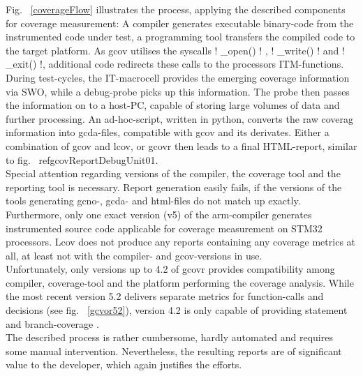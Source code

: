 \documentclass[master,english,smartquotes,apa]{hgbthesis}
\begin{document}
			Fig. ~\ref{coverageFlow} illustrates the process, applying the described components for coverage measurement: A compiler generates executable binary-code from the instrumented code under test, a programming tool transfers the compiled code to the target platform. As gcov utilises the syscalls \lstC ! _open() ! , \lstC ! _write() ! and  \lstC ! _exit() !, additional code redirects these calls to the processors ITM-functions. During test-cycles, the IT-macrocell provides the emerging coverage information via SWO, while a debug-probe picks up this information. The probe then passes the information on to a host-PC, capable of storing large volumes of data and further processing. An ad-hoc-script, written in python, converts the raw coverag information into gcda-files, compatible with gcov and its derivates. Either a combination of gcov and lcov, or gcovr then leads to a final HTML-report, similar to fig. ~ref{gcovReportDebugUnit01}. \\
			Special attention regarding versions of the compiler, the coverage tool and the reporting tool is necessary. Report generation easily fails, if the versions of the tools generating gcno-, gcda- and html-files do not match up exactly. Furthermore, only one exact version (v5) of the arm-compiler generates instrumented source code applicable for coverage measurement on STM32 processors. Lcov does not produce any reports containing any coverage metrics at all, at least not with the compiler- and gcov-versions in use. \\
			Unfortunately, only versions up to 4.2 of gcovr provides compatibility among compiler, coverage-tool and the platform performing the coverage analysis. While the most recent version 5.2 delivers separate metrics for function-calls and decisions (see fig. ~\ref{gcvor52}), version 4.2 is only capable of providing statement and branch-coverage\cite{gcovr} . \\

			The described process is rather cumbersome, hardly automated and requires some manual intervention. Nevertheless, the resulting reports are of significant value to the developer, which again justifies the efforts. 
\end{document}
